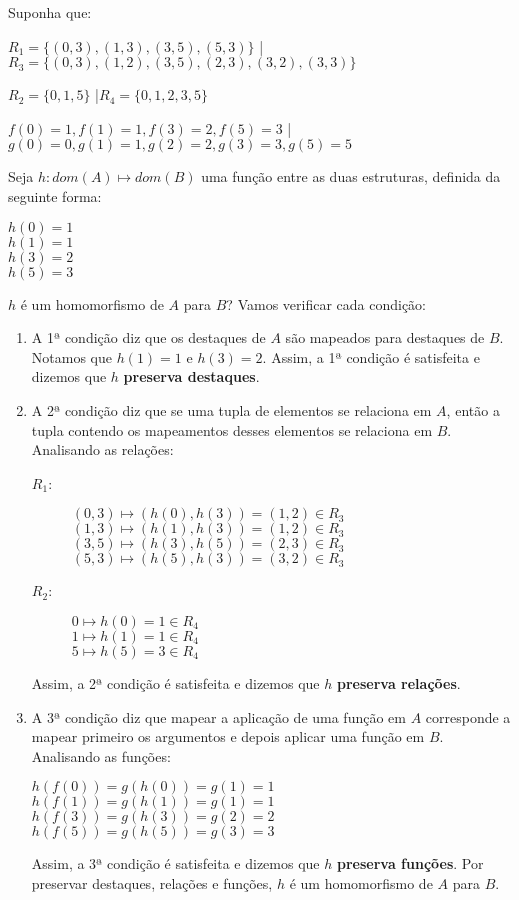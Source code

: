 Suponha que:
\begin{description}
    \item $R_1 = \{(0,3), (1,3), (3,5), (5, 3)\}$ \quad|\quad $R_3 = \{(0,3), (1,2), (3,5), (2, 3), (3,2), (3,3)\}$
    \item $R_2 = \{0,1,5\}$ \quad|\quad $R_4 = \{0,1,2,3,5\}$
    \item $f(0) = 1, f(1) = 1, f(3) = 2, f(5) = 3$ \quad|\quad $g(0) = 0, g(1) = 1, g(2) = 2, g(3) = 3, g(5) = 5$
\end{description}
Seja $h: dom(A) \mapsto dom(B)$ uma função entre as duas estruturas, definida da seguinte forma:
\begin{center}
    $h(0) = 1$ \\
    $h(1) = 1$ \\
    $h(3) = 2$ \\
    $h(5) = 3$
\end{center}
$h$ é um homomorfismo de $A$ para $B$? Vamos verificar cada condição:
\begin{enumerate}
    \item A 1ª condição diz que os destaques de $A$ são mapeados para destaques de $B$. Notamos que $h(1) = 1$ e $h(3) = 2$. Assim, a 1ª condição é satisfeita e dizemos que $h$ \textbf{preserva destaques}.
    \item A 2ª condição diz que se uma tupla de elementos se relaciona em $A$, então a tupla contendo os mapeamentos desses elementos se relaciona em $B$. Analisando as relações:
    \begin{description}
        \item[$R_1$:] $(0,3) \mapsto (h(0),h(3)) = (1,2) \in R_3$\\
        $(1,3) \mapsto (h(1),h(3)) = (1,2) \in R_3$ \\
        $(3,5) \mapsto (h(3),h(5)) = (2,3) \in R_3$ \\
        $(5,3) \mapsto (h(5),h(3)) = (3,2) \in R_3$
        \item[$R_2$:] $0 \mapsto h(0) = 1 \in R_4$ \\
        $1 \mapsto h(1) = 1 \in R_4$ \\
        $5 \mapsto h(5) = 3 \in R_4$
    \end{description}
    Assim, a 2ª condição é satisfeita e dizemos que $h$ \textbf{preserva relações}.
    \item A 3ª condição diz que mapear a aplicação de uma função em $A$ corresponde a mapear primeiro os argumentos e depois aplicar uma função em $B$. Analisando as funções:
    \begin{center}
        $h(f(0)) = g(h(0)) = g(1) = 1$ \\
        $h(f(1)) = g(h(1)) = g(1) = 1$ \\
        $h(f(3)) = g(h(3)) = g(2) = 2$ \\
        $h(f(5)) = g(h(5)) = g(3) = 3$
    \end{center}
    Assim, a 3ª condição é satisfeita e dizemos que $h$ \textbf{preserva funções}. Por preservar destaques, relações e funções, $h$ é um homomorfismo de $A$ para $B$.
\end{enumerate}
     
